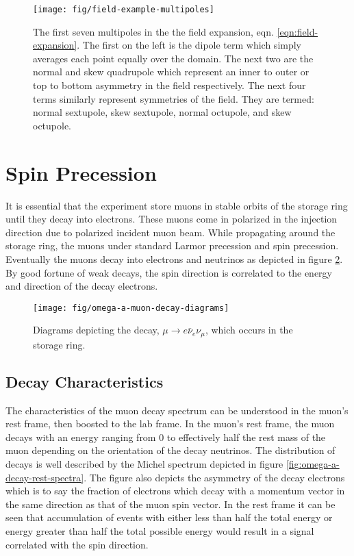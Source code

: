 \begin{figure}
\label{fig:field-example-multipoles}
\texttt{[image: fig/field-example-multipoles]}
\caption{The first seven multipoles in the the field expansion, eqn. \ref{eqn:field-expansion}.  The first on the left is the dipole term which simply averages each point equally over the domain.  The next two are the normal and skew quadrupole which represent an inner to outer or top to bottom asymmetry in the field respectively.  The next four terms similarly represent symmetries of the field.  They are termed: normal sextupole, skew sextupole, normal octupole, and skew octupole.}
\end{figure}

\section{Spin Precession} \label{sec:spin-precession}

It is essential that the experiment store muons in stable orbits of the storage ring until they decay into electrons.  These muons come in polarized in the injection direction due to polarized incident muon beam.  While propagating around the storage ring, the muons under standard Larmor precession and spin precession.  Eventually the muons decay into electrons and neutrinos as depicted in figure \ref{fig:omega-a-muon-decay-diagrams}.  By good fortune of weak decays, the spin direction is correlated to the energy and direction of the decay electrons.

\begin{figure}
\label{fig:omega-a-muon-decay-diagrams}
\texttt{[image: fig/omega-a-muon-decay-diagrams]}
\caption{Diagrams depicting the decay, $\mu \rightarrow e \bar{\nu}_e \nu_\mu$, which occurs in the \gmtwo storage ring. }
\end{figure}

\subsection{Decay Characteristics}

The characteristics of the muon decay spectrum can be understood in the muon's rest frame, then boosted to the lab frame.  In the muon's rest frame, the muon decays with an energy ranging from 0 to effectively half the rest mass of the muon depending on the orientation of the decay neutrinos.  The distribution of decays is well described by the Michel spectrum depicted in figure \ref{fig:omega-a-decay-rest-spectra}.  The figure also depicts the asymmetry of the decay electrons which is to say the fraction of electrons which decay with a momentum vector in the same direction as that of the muon spin vector.  In the rest frame it can be seen that accumulation of events with either less than half the total energy or energy greater than half the total possible energy would result in a signal correlated with the spin direction.\cite{e821-prd}

